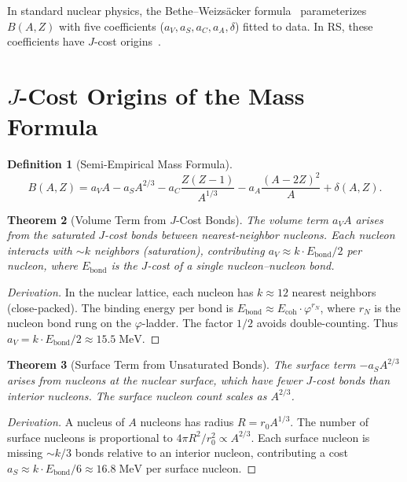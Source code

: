 \documentclass[12pt,a4paper]{article}
\newtheorem{theorem}{Theorem}[section]
\theoremstyle{definition}
\newtheorem{definition}[theorem]{Definition}
\theoremstyle{remark}
\begin{document}
In standard nuclear physics, the Bethe--Weizs\"acker
formula~\cite{BW1935} parameterizes $B(A,Z)$ with five
coefficients ($a_V, a_S, a_C, a_A, \delta$) fitted to data.  In
RS, these coefficients have $J$-cost origins~\cite{RS_Axioms}.

\section{$J$-Cost Origins of the Mass Formula}
\label{sec:jcost}

\begin{definition}[Semi-Empirical Mass Formula]
\begin{equation}
  B(A, Z) = a_V A - a_S A^{2/3} - a_C \frac{Z(Z-1)}{A^{1/3}}
  - a_A \frac{(A - 2Z)^2}{A} + \delta(A, Z).
  \label{eq:bw}
\end{equation}
\end{definition}

\begin{theorem}[Volume Term from $J$-Cost Bonds]
\label{thm:volume}
The volume term $a_V A$ arises from the saturated $J$-cost bonds
between nearest-neighbor nucleons.  Each nucleon interacts with
$\sim k$ neighbors (saturation), contributing
$a_V \approx k \cdot E_{\mathrm{bond}}/2$ per nucleon, where
$E_{\mathrm{bond}}$ is the $J$-cost of a single nucleon--nucleon
bond.
\end{theorem}

\begin{proof}[Derivation]
In the nuclear lattice, each nucleon has $k \approx 12$
nearest neighbors (close-packed).  The binding energy per bond is
$E_{\mathrm{bond}} \approx E_{\mathrm{coh}} \cdot \varphi^{r_N}$,
where $r_N$ is the nucleon bond rung on the $\varphi$-ladder.
The factor $1/2$ avoids double-counting.  Thus
$a_V = k \cdot E_{\mathrm{bond}}/2 \approx 15.5\;\mathrm{MeV}$.
\end{proof}

\begin{theorem}[Surface Term from Unsaturated Bonds]
\label{thm:surface}
The surface term $-a_S A^{2/3}$ arises from nucleons at the
nuclear surface, which have fewer $J$-cost bonds than interior
nucleons.  The surface nucleon count scales as $A^{2/3}$.
\end{theorem}

\begin{proof}[Derivation]
A nucleus of $A$ nucleons has radius $R = r_0 A^{1/3}$.  The
number of surface nucleons is proportional to
$4\pi R^2 / r_0^2 \propto A^{2/3}$.  Each surface nucleon is
missing $\sim k/3$ bonds relative to an interior nucleon,
contributing a cost $a_S \approx k \cdot E_{\mathrm{bond}}/6
\approx 16.8\;\mathrm{MeV}$ per surface nucleon.
\end{proof}
\end{document}
